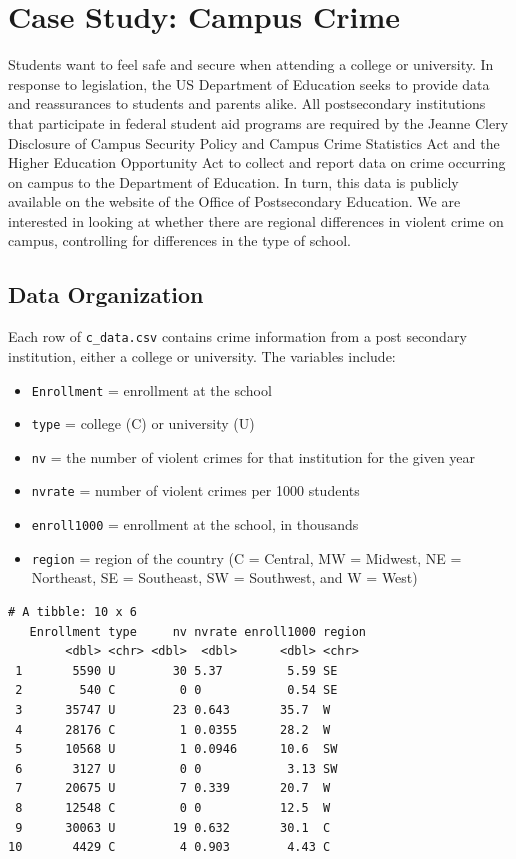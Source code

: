 \documentclass[
]{krantz}
\providecommand{\tightlist}{%
  \setlength{\itemsep}{0pt}\setlength{\parskip}{0pt}}
\begin{document}
\hypertarget{case-study-campus-crime}{%
\section{Case Study: Campus Crime}\label{case-study-campus-crime}}

Students want to feel safe and secure when attending a college or university. In response to legislation, the US Department of Education seeks to provide data and reassurances to students and parents alike. All postsecondary institutions that participate in federal student aid programs are required by the Jeanne Clery Disclosure of Campus Security Policy and Campus Crime Statistics Act and the Higher Education Opportunity Act to collect and report data on crime occurring on campus to the Department of Education. In turn, this data is publicly available on the website of the Office of Postsecondary Education. We are interested in looking at whether there are regional differences in violent crime on campus, controlling for differences in the type of school.

\hypertarget{data-organization}{%
\subsection{Data Organization}\label{data-organization}}

Each row of \texttt{c\_data.csv} contains crime information from a post secondary institution, either a college or university. The variables include:

\begin{itemize}
\tightlist
\item
  \texttt{Enrollment} = enrollment at the school
\item
  \texttt{type} = college (C) or university (U)
\item
  \texttt{nv} = the number of violent crimes for that institution for the given year
\item
  \texttt{nvrate} = number of violent crimes per 1000 students
\item
  \texttt{enroll1000} = enrollment at the school, in thousands
\item
  \texttt{region} = region of the country (C = Central, MW = Midwest, NE = Northeast, SE = Southeast, SW = Southwest, and W = West)
\end{itemize}

\begin{verbatim}
# A tibble: 10 x 6
   Enrollment type     nv nvrate enroll1000 region
        <dbl> <chr> <dbl>  <dbl>      <dbl> <chr> 
 1       5590 U        30 5.37         5.59 SE    
 2        540 C         0 0            0.54 SE    
 3      35747 U        23 0.643       35.7  W     
 4      28176 C         1 0.0355      28.2  W     
 5      10568 U         1 0.0946      10.6  SW    
 6       3127 U         0 0            3.13 SW    
 7      20675 U         7 0.339       20.7  W     
 8      12548 C         0 0           12.5  W     
 9      30063 U        19 0.632       30.1  C     
10       4429 C         4 0.903        4.43 C     
\end{verbatim}
\end{document}
